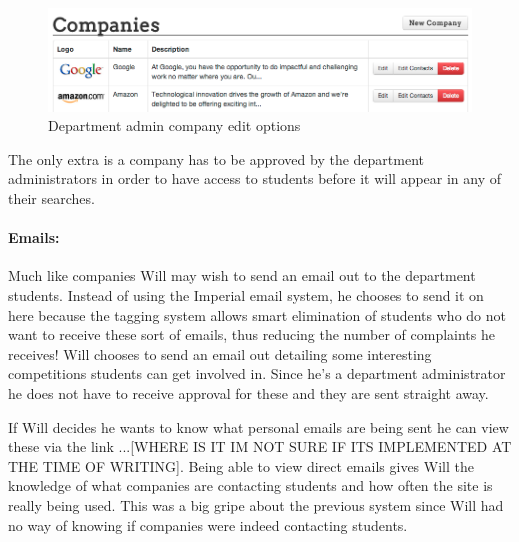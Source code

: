     \begin{figure}[H]\centering
    \includegraphics[scale=0.5]{images/user_experiences/admin/admin_company_edit_options}
    \caption{Department admin company edit options}
    \end{figure}

    The only extra is a company has to be approved by the department administrators in order to have access to students before it will appear in any of their searches.

  \paragraph{Emails:}
    Much like companies Will may wish to send an email out to the department students. Instead of using the Imperial email system, he chooses to send it on here because the tagging system allows smart elimination of students who do not want to receive these sort of emails, thus reducing the number of complaints he receives! Will chooses to send an email out detailing some interesting competitions students can get involved in. Since he's a department administrator he does not have to receive approval for these and they are sent straight away.

    If Will decides he wants to know what personal emails are being sent he can view these via the link ...[WHERE IS IT IM NOT SURE IF ITS IMPLEMENTED AT THE TIME OF WRITING]. Being able to view direct emails gives Will the knowledge of what companies are contacting students and how often the site is really being used. This was a big gripe about the previous system since Will had no way of knowing if companies were indeed contacting students.
